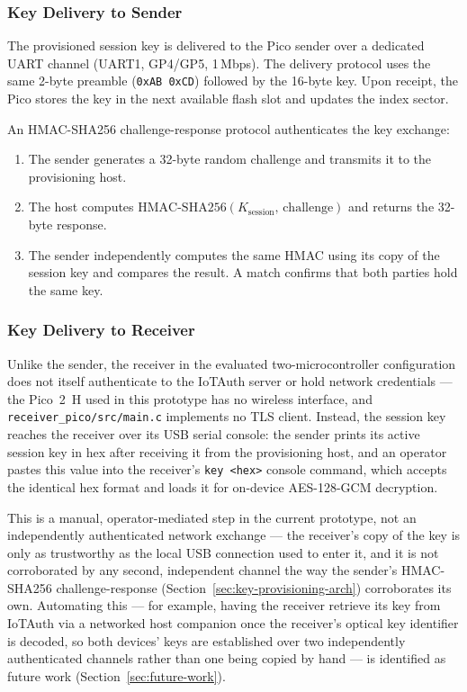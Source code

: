 \documentclass[conference]{IEEEtran}
\begin{document}
\subsubsection{Key Delivery to Sender}

The provisioned session key is delivered to the Pico sender over a dedicated UART channel (UART1, GP4/GP5, 1\,Mbps). The delivery protocol uses the same 2-byte preamble (\texttt{0xAB\,0xCD}) followed by the 16-byte key. Upon receipt, the Pico stores the key in the next available flash slot and updates the index sector.

An HMAC-SHA256 challenge-response protocol authenticates the key exchange:

\begin{enumerate}
\item The sender generates a 32-byte random challenge and transmits it to the provisioning host.
\item The host computes $\text{HMAC-SHA256}(K_{\text{session}},\, \text{challenge})$ and returns the 32-byte response.
\item The sender independently computes the same HMAC using its copy of the session key and compares the result. A match confirms that both parties hold the same key.
\end{enumerate}

\subsubsection{Key Delivery to Receiver}

Unlike the sender, the receiver in the evaluated two-microcontroller configuration does not itself authenticate to the IoTAuth server or hold network credentials — the Pico~2~H used in this prototype has no wireless interface, and \texttt{receiver\_pico/src/main.c} implements no TLS client. Instead, the session key reaches the receiver over its USB serial console: the sender prints its active session key in hex after receiving it from the provisioning host, and an operator pastes this value into the receiver's \texttt{key <hex>} console command, which accepts the identical hex format and loads it for on-device AES-128-GCM decryption.

This is a manual, operator-mediated step in the current prototype, not an independently authenticated network exchange — the receiver's copy of the key is only as trustworthy as the local USB connection used to enter it, and it is not corroborated by any second, independent channel the way the sender's HMAC-SHA256 challenge-response (Section~\ref{sec:key-provisioning-arch}) corroborates its own. Automating this — for example, having the receiver retrieve its key from IoTAuth via a networked host companion once the receiver's optical key identifier is decoded, so both devices' keys are established over two independently authenticated channels rather than one being copied by hand — is identified as future work (Section~\ref{sec:future-work}).
\end{document}
